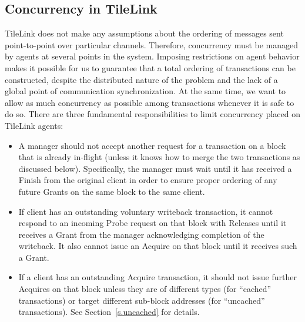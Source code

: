 \subsection{Concurrency in TileLink}

TileLink does not make any assumptions about the ordering of messages sent point-to-point over particular channels.
Therefore, concurrency must be managed by agents at several points in the system.
Imposing restrictions on agent behavior makes it possible for us to guarantee that a total ordering of transactions can be constructed,
despite the distributed nature of the problem and the lack of a global point of communication synchronization.
At the same time, we want to allow as much concurrency as possible among transactions whenever it is safe to do so.
There are three fundamental responsibilities to limit concurrency placed on TileLink agents:
\begin{itemize}
\item A manager should not accept another request for a transaction on a block that is already in-flight (unless it knows how to merge the two transactions as discussed below). Specifically, the manager must wait until it has received a Finish from the original client in order to ensure proper ordering of any future Grants on the same block to the same client.
\item If client has an outstanding voluntary writeback transaction, it cannot respond to an incoming Probe request on that block with Releases until it receives a Grant from the manager acknowledging completion of the writeback. It also cannot issue an Acquire on that block until it receives such a Grant.
\item If a client has an outstanding Acquire transaction, it should not issue further Acquires on that block unless they are of different types (for ``cached'' transactions)
or target different sub-block addresses (for ``uncached'' transactions). See Section~\ref{s.uncached} for details.
\end{itemize}

